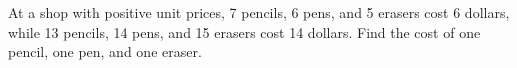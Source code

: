 At a shop with positive unit prices, 7 pencils, 6 pens, and 5 erasers cost 6 dollars, while 13 pencils, 14 pens, and 15 erasers cost 14 dollars. Find the cost of one pencil, one pen, and one eraser.
